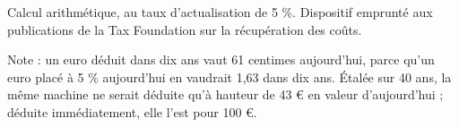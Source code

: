 Calcul arithmétique, au taux d'actualisation de 5 \%. Dispositif emprunté aux publications de la Tax Foundation sur la récupération des coûts.\par Note : un euro déduit dans dix ans vaut 61 centimes aujourd'hui, parce qu'un euro placé à 5 \% aujourd'hui en vaudrait 1,63 dans dix ans. Étalée sur 40 ans, la même machine ne serait déduite qu'à hauteur de 43 \euro{} en valeur d'aujourd'hui ; déduite immédiatement, elle l'est pour 100 \euro{}.
